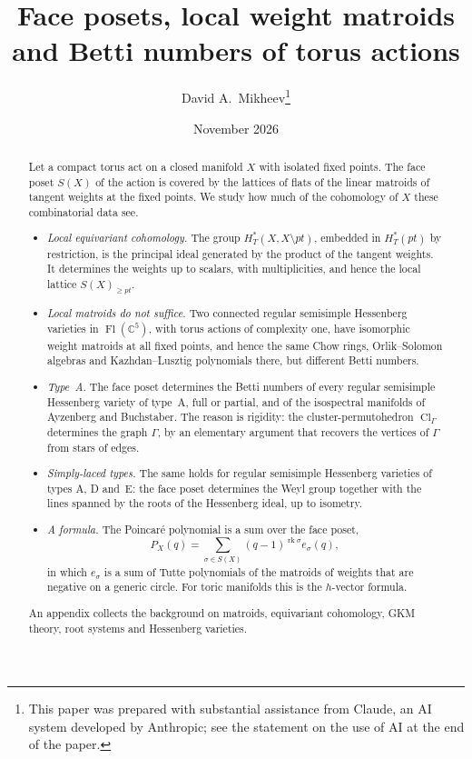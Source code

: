 \documentclass[11pt,a4paper]{article}
\numberwithin{equation}{section}
\theoremstyle{plain}
\theoremstyle{definition}
\theoremstyle{remark}
\newcommand{\C}{\mathbb{C}}
\newcommand{\HT}{H^{*}_{T}}
\DeclareMathOperator{\Fl}{Fl}
\DeclareMathOperator{\rk}{rk}
\DeclareMathOperator{\Cl}{Cl}
\begin{document}
\title{Face posets, local weight matroids and Betti numbers of torus actions}
\author{David A.~Mikheev\thanks{This paper was prepared with substantial assistance from Claude, an AI system developed by Anthropic; see the statement on the use of AI at the end of the paper.}}
\date{November 2026}
\maketitle

\begin{abstract}
Let a compact torus act on a closed manifold $X$ with isolated fixed points. The face poset $S(X)$ of the action is covered by the lattices of flats of the linear matroids of tangent weights at the fixed points. We study how much of the cohomology of $X$ these combinatorial data see.
\begin{itemize}[leftmargin=1.5em,itemsep=1pt,topsep=3pt]
\item \emph{Local equivariant cohomology.} The group $\HT(X,X\setminus pt)$, embedded in $\HT(pt)$ by restriction, is the principal ideal generated by the product of the tangent weights. It determines the weights up to scalars, with multiplicities, and hence the local lattice $S(X)_{\geqslant pt}$.
\item \emph{Local matroids do not suffice.} Two connected regular semisimple Hessenberg varieties in $\Fl(\C^5)$, with torus actions of complexity one, have isomorphic weight matroids at all fixed points, and hence the same Chow rings, Orlik--Solomon algebras and Kazhdan--Lusztig polynomials there, but different Betti numbers.
\item \emph{Type~A.} The face poset determines the Betti numbers of every regular semisimple Hessenberg variety of type~A, full or partial, and of the isospectral manifolds of Ayzenberg and Buchstaber. The reason is rigidity: the cluster-permutohedron $\Cl_\Gamma$ determines the graph $\Gamma$, by an elementary argument that recovers the vertices of $\Gamma$ from stars of edges.
\item \emph{Simply-laced types.} The same holds for regular semisimple Hessenberg varieties of types A, D and~E: the face poset determines the Weyl group together with the lines spanned by the roots of the Hessenberg ideal, up to isometry.
\item \emph{A formula.} The Poincaré polynomial is a sum over the face poset,
\[
P_X(q)=\sum_{\sigma\in S(X)}(q-1)^{\rk\sigma}e_\sigma(q),
\]
in which $e_\sigma$ is a sum of Tutte polynomials of the matroids of weights that are negative on a generic circle. For toric manifolds this is the $h$-vector formula.
\end{itemize}
An appendix collects the background on matroids, equivariant cohomology, GKM theory, root systems and Hessenberg varieties.
\end{abstract}
\end{document}
